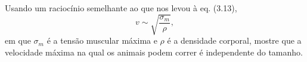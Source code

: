Usando um raciocínio semelhante ao que nos levou à eq. (3.13),
\[
  v \sim \sqrt{\frac{\sigma_m}{\rho}},
\]
em que $\sigma_m$ é a tensão muscular máxima e $\rho$ é a densidade corporal, mostre que a velocidade máxima na qual os animais podem correr é independente do tamanho.


